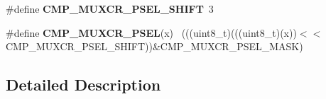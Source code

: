 \begin{DoxyCompactItemize}
\item 
\hypertarget{group___c_m_p___register___masks_gab686629f56ced4b88c699f0f610dece5}{}\#define {\bfseries C\+M\+P\+\_\+\+M\+U\+X\+C\+R\+\_\+\+P\+S\+E\+L\+\_\+\+S\+H\+I\+F\+T}~3\label{group___c_m_p___register___masks_gab686629f56ced4b88c699f0f610dece5}

\item 
\hypertarget{group___c_m_p___register___masks_gae2f01a26dfcb880ec6dcca859629c743}{}\#define {\bfseries C\+M\+P\+\_\+\+M\+U\+X\+C\+R\+\_\+\+P\+S\+E\+L}(x)                                            ~(((uint8\+\_\+t)(((uint8\+\_\+t)(x))$<$$<$C\+M\+P\+\_\+\+M\+U\+X\+C\+R\+\_\+\+P\+S\+E\+L\+\_\+\+S\+H\+I\+F\+T))\&C\+M\+P\+\_\+\+M\+U\+X\+C\+R\+\_\+\+P\+S\+E\+L\+\_\+\+M\+A\+S\+K)\label{group___c_m_p___register___masks_gae2f01a26dfcb880ec6dcca859629c743}

\end{DoxyCompactItemize}


\subsection{Detailed Description}
